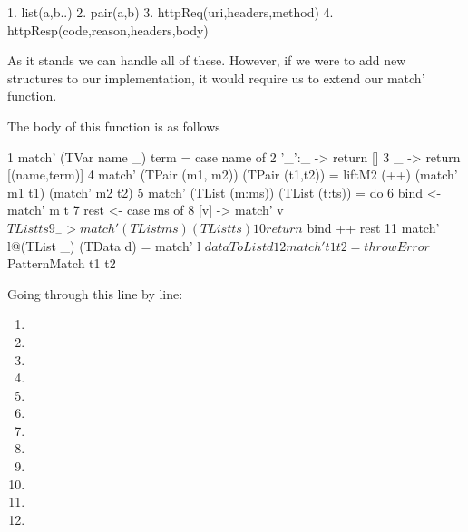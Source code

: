 \begin{code}
    1. list(a,b..)
    2. pair(a,b)
    3. httpReq(uri,headers,method)
    4. httpResp(code,reason,headers,body)
\end{code}

As it stands we can handle all of these. However, if we were to add new structures to our implementation, it would require us to extend our match' function. 

The body of this function is as follows
\begin{code}
1  match' (TVar name _) term = case name of                                                
2                                 '_':_ -> return []
3                                 _     -> return [(name,term)]
4  match' (TPair (m1, m2)) (TPair (t1,t2)) = liftM2 (++) (match' m1 t1)  (match' m2 t2)
5  match' (TList (m:ms)) (TList (t:ts)) = do
6                 bind <- match' m t
7                 rest <- case ms of
8                    [v] -> match' v $ TList ts
9                    _   -> match' (TList ms) (TList ts)
10                return $ bind ++ rest
11 match' l@(TList _) (TData d) = match' l $ dataToList d
12 match' t1 t2 = throwError $ PatternMatch t1 t2
\end{code}

Going through this line by line:
\begin{enumerate}
    \item    
    \item    
    \item    
    \item    
    \item    
    \item    
    \item    
    \item    
    \item    
    \item    
    \item    
    \item    
\end{enumerate}
